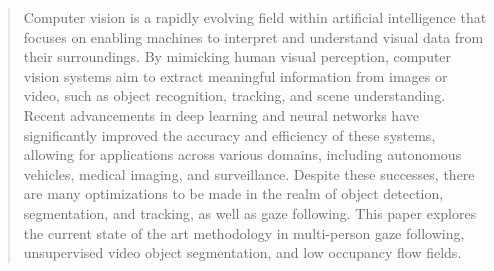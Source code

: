 \documentclass{article}
\theoremstyle{plain}
\theoremstyle{definition}
\theoremstyle{remark}
\begin{document}



\begin{abstract}
\vspace{10pt} 
Computer vision is a rapidly evolving field within artificial intelligence that focuses on enabling machines to interpret and understand visual data from their surroundings. By mimicking human visual perception, computer vision systems aim to extract meaningful information from images or video, such as object recognition, tracking, and scene understanding. Recent advancements in deep learning and neural networks have significantly improved the accuracy and efficiency of these systems, allowing for applications across various domains, including autonomous vehicles, medical imaging, and surveillance. Despite these successes, there are many optimizations to be made in the realm of object detection, segmentation, and tracking, as well as gaze following. This paper explores the current state of the art methodology in multi-person gaze following, unsupervised video object segmentation, and low occupancy flow fields.
\end{abstract}
\end{document}
